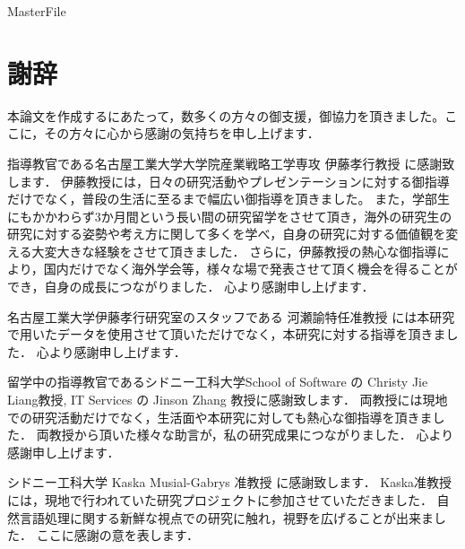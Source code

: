 \expandafter\ifx\csname MasterFile\endcsname\relax
\def\SubFile{hoge}


\fi
\cleardoublepage
\chapter*{謝辞}

本論文を作成するにあたって，数多くの方々の御支援，御協力を頂きました。ここに，その方々に心から感謝の気持ちを申し上げます． \par
\vspace{0.5cm}

指導教官である名古屋工業大学大学院産業戦略工学専攻 伊藤孝行教授 に感謝致します．
伊藤教授には，日々の研究活動やプレゼンテーションに対する御指導だけでなく，普段の生活に至るまで幅広い御指導を頂きました。
また，学部生にもかかわらず3か月間という長い間の研究留学をさせて頂き，海外の研究生の研究に対する姿勢や考え方に関して多くを学べ，自身の研究に対する価値観を変える大変大きな経験をさせて頂きました．
さらに，伊藤教授の熱心な御指導により，国内だけでなく海外学会等，様々な場で発表させて頂く機会を得ることができ，自身の成長につながりました．
心より感謝申し上げます． \par
\vspace{0.5cm}

名古屋工業大学伊藤孝行研究室のスタッフである 河瀬諭特任准教授 には本研究で用いたデータを使用させて頂いただけでなく，本研究に対する指導を頂きました．
心より感謝申し上げます． \par
\vspace{0.5cm}

留学中の指導教官であるシドニー工科大学School of Software の  Christy Jie Liang教授, IT Services の  Jinson Zhang 教授に感謝致します．
両教授には現地での研究活動だけでなく，生活面や本研究に対しても熱心な御指導を頂きました．
両教授から頂いた様々な助言が，私の研究成果につながりました．
心より感謝申し上げます． \par
\vspace{0.5cm}

シドニー工科大学 Kaska Musial-Gabrys 准教授 に感謝致します．
Kaska准教授には，現地で行われていた研究プロジェクトに参加させていただきました．
自然言語処理に関する新鮮な視点での研究に触れ，視野を広げることが出来ました．
ここに感謝の意を表します． \par
\vspace{0.5cm}

